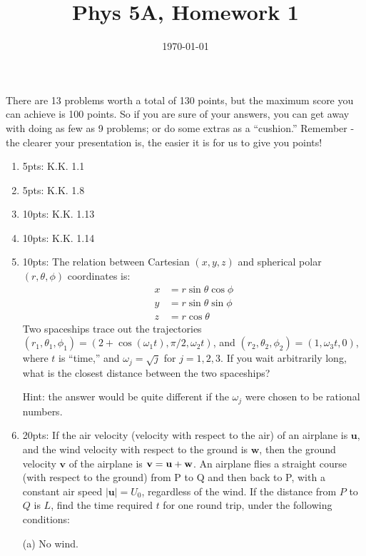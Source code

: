 \documentclass[10pt, oneside]{amsart}   	%
\title{Phys 5A, Homework 1}
\date{\today}							%
\begin{document}
\maketitle
	There are 13 problems worth a total of 130 points, but the maximum score you can achieve is 100 points. So if you are sure of your answers, you can get away with doing as few as 9 problems; or do some extras as a ``cushion.'' Remember - the clearer your presentation is, the easier it is for us to give you points!
	
\begin{enumerate}
\item{5pts:}
K.K. 1.1

\item{5pts:}
K.K. 1.8

\item{10pts:}
K.K. 1.13

\item{10pts:}
K.K. 1.14

\item{10pts:} The relation between Cartesian $(x, y, z)$ and spherical polar $(r, \theta, \phi)$ coordinates is:
\begin{align*}
x &= r \sin \theta \cos \phi \\
y &= r \sin \theta \sin \phi \\
z &= r  \cos \theta 
\end{align*}
Two spaceships trace out the trajectories $(r_1, \theta_1, \phi_1) = ( 2 + \cos( \omega_1 t), \pi/2, \omega_2 t)$, and $(r_2, \theta_2, \phi_2) = (1, \omega_3 t, 0)$, where $t$ is ``time,'' and $\omega_j = \sqrt{j}$ for $j = 1, 2, 3$. If you wait arbitrarily long, what is the closest distance between the two spaceships?

Hint: the answer would be quite different if the  $\omega_j$ were chosen to be rational numbers.


\item{20pts:} If the air velocity (velocity with respect to the air) of an airplane is $\mathbf{u}$, and the wind velocity with respect to the ground is $\mathbf{w}$, then the ground velocity $\mathbf{v}$ of the airplane is $\mathbf{v} = \bf{u} + \bf{w}$.
An airplane flies a straight course (with respect to the ground) from P to Q and then back to P, with a constant air speed $|\mathbf{u}| = U_0$, regardless of the wind.
If the distance from $P$ to $Q$ is $L$, find the time required $t$ for one round trip, under the following conditions:

(a) No wind.


\end{enumerate}
\end{document}
